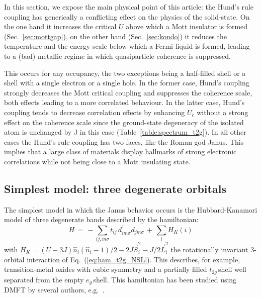 \documentclass[]{ar2e-changed}%
\def\Ueff{U_{\mathrm{eff}}}
\def\hn{\hat{n}}
\def\ttg{$t_{2g}\,$}
\def\eg{$e_{g}\,$}
\begin{document}
In this section, we expose the main physical point of this article: 
the Hund's rule coupling %
has generically a conflicting effect on the physics of the solid-state. On the one hand it increases the
critical $U$ above which a Mott insulator is formed (Sec.~\ref{sec:mottgap}), on the other hand
(Sec.~\ref{sec:kondo}) it reduces the temperature and the energy
scale below which a Fermi-liquid is formed, leading to a (bad) metallic regime 
in which quasiparticle coherence is suppressed.

This occurs for any occupancy, the two exceptions
being a half-filled shell or a shell with a single electron or a single hole. 
%
In the former case, Hund's coupling strongly decreases the Mott critical coupling 
and suppresses the coherence scale, both effects leading to a more  correlated behaviour. 
%
In the latter case, Hund's coupling tends to decrease correlation effects by enhancing
$U_c$ without a strong effect on the coherence scale 
since the ground-state degeneracy of the isolated atom is unchanged by J in this case 
(Table~\ref{table:spectrum_t2g}).  
% 
In all other cases the Hund's rule coupling  has two faces, like the Roman god Janus. 
%
This implies that a large class of materials %
display hallmarks of strong electronic correlations while not being close to a Mott insulating state. 

\subsection{Simplest model: three degenerate orbitals}
\label{sec:3orbital_model}

The simplest model in which %
the Janus behavior occurs is the Hubbard-Kanamori model of three degenerate bands 
described by the hamiltonian:
\begin{equation}
H\,=\,-\sum_{ij,m\sigma} t_{ij}\, d^\dagger_{im\sigma}d_{jm\sigma}\,+\,\sum_i H_{K}(i)
\end{equation}
with  $H_K=(U-3J)\hn_i(\hn_i-1)/2-2J\vec{S}_i^2-J/2\vec{L}_i^2$ the rotationally invariant 3-orbital interaction 
of Eq.~(\ref{eq:ham_t2g_NSL}). %
This describes, for example, transition-metal oxides with cubic symmetry
and a partially filled \ttg shell well separated from the empty \eg shell. 
This hamiltonian has been studied using DMFT by several authors, e.g.~\cite{werner08,werner09, demedici_prl_2011}.
\end{document}
